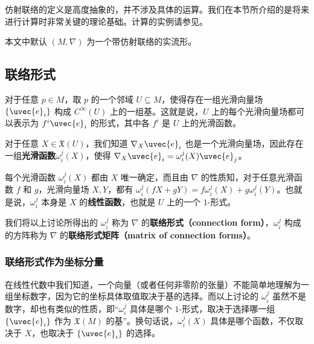 



仿射联络的定义是高度抽象的，并不涉及具体的运算。我们在本节所介绍的是将来进行计算时非常关键的理论基础。计算的实例请参见。

本文中默认 $(M, \nabla)$ 为一个带仿射联络的实流形。

\subsection{联络形式}

对于任意 $p\in M$，取 $p$ 的一个邻域 $U\subseteq M$，使得存在一组光滑向量场 $\{\uvec{e}_i\}$ 构成 $C^{\infty}(U)$ 上的一组基。这就是说，$U$ 上的每个光滑向量场都可以表示为 $f^i\uvec{e}_i$ 的形式，其中各 $f^i$ 是 $U$ 上的光滑函数。

对于任意 $X\in\mathfrak{X}(U)$，我们知道 $\nabla_X\uvec{e}_i$ 也是一个光滑向量场，因此存在一组\textbf{光滑函数}$\omega^j_i(X)$，使得 $\nabla_X\uvec{e}_i=\omega^j_i(X)\uvec{e}_j$。

每个光滑函数 $\omega^j_i(X)$ 都由 $X$ 唯一确定，而且由 $\nabla$ 的性质知，对于任意光滑函数 $f$ 和 $g$，光滑向量场 $X, Y$，都有 $\omega^j_i(fX+gY)=f\omega^j_i(X)+g\omega^j_i(Y)$。也就是说，$\omega^j_i$ 本身是 $X$ 的\textbf{线性函数}，也就是 $U$ 上的一个 $1$-形式。

我们将以上讨论所得出的 $\omega^j_i$ 称为 $\nabla$ 的\textbf{联络形式（connection form）}，$\omega^j_i$ 构成的方阵称为 $\nabla$ 的\textbf{联络形式矩阵（matrix of connection forms）}。

\subsubsection{联络形式作为坐标分量}

在线性代数中我们知道，一个向量（或者任何非零阶的张量）不能简单地理解为一组坐标数字，因为它的坐标具体取值取决于基的选择。而以上讨论的 $\omega^j_i$ 虽然不是数字，却也有类似的性质，即“$\omega^j_i$ 具体是哪个 $1$-形式，取决于选择哪一组 $\{\uvec{e}_i\}$ 作为 $\mathfrak{X}(M)$ 的基”。换句话说，$\omega^j_i(X)$ 具体是哪个函数，不仅取决于 $X$，也取决于 $\{\uvec{e}_i\}$ 的选择。

